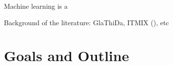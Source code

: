 Machine learning is a   

%
%

Background of the literature: GlaThiDa, ITMIX (\citet{Farinotti2017}), etc 


\section{Goals and Outline}\label{goals}

